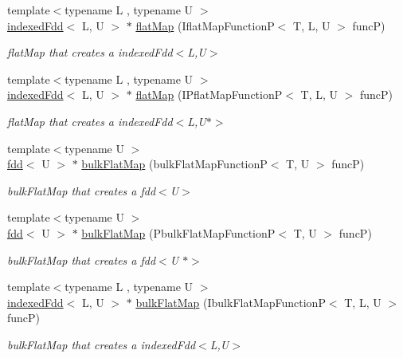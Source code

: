 \begin{DoxyCompactItemize}
{\footnotesize template$<$typename L , typename U $>$ }\\\hyperlink{classfaster_1_1indexedFdd}{indexed\+Fdd}$<$ L, U $>$ $\ast$ \hyperlink{group__flatmap_ga499a1c3638cc1e95e483cd91c7a884a7}{flat\+Map} (Iflat\+Map\+FunctionP$<$ T, L, U $>$ funcP)
\begin{DoxyCompactList}\small\item\em flat\+Map that creates a indexed\+Fdd$<$\+L,\+U$>$ \end{DoxyCompactList}\item 
{\footnotesize template$<$typename L , typename U $>$ }\\\hyperlink{classfaster_1_1indexedFdd}{indexed\+Fdd}$<$ L, U $>$ $\ast$ \hyperlink{group__flatmap_gab1c639e6fe55d66ac0cb50011d537567}{flat\+Map} (I\+Pflat\+Map\+FunctionP$<$ T, L, U $>$ funcP)
\begin{DoxyCompactList}\small\item\em flat\+Map that creates a indexed\+Fdd$<$\+L,\+U$\ast$$>$ \end{DoxyCompactList}\item 
{\footnotesize template$<$typename U $>$ }\\\hyperlink{classfaster_1_1fdd}{fdd}$<$ U $>$ $\ast$ \hyperlink{group__bulk_ga6f87b4e650b28ea32c363f6d902babb1}{bulk\+Flat\+Map} (bulk\+Flat\+Map\+FunctionP$<$ T, U $>$ funcP)
\begin{DoxyCompactList}\small\item\em bulk\+Flat\+Map that creates a fdd$<$\+U$>$ \end{DoxyCompactList}\item 
{\footnotesize template$<$typename U $>$ }\\\hyperlink{classfaster_1_1fdd}{fdd}$<$ U $>$ $\ast$ \hyperlink{group__bulk_ga77058c1365a8696105acaf1468e8d3b4}{bulk\+Flat\+Map} (Pbulk\+Flat\+Map\+FunctionP$<$ T, U $>$ funcP)
\begin{DoxyCompactList}\small\item\em bulk\+Flat\+Map that creates a fdd$<$\+U $\ast$$>$ \end{DoxyCompactList}\item 
{\footnotesize template$<$typename L , typename U $>$ }\\\hyperlink{classfaster_1_1indexedFdd}{indexed\+Fdd}$<$ L, U $>$ $\ast$ \hyperlink{group__bulk_gadfcb736f7161db476dbbb275f1d08659}{bulk\+Flat\+Map} (Ibulk\+Flat\+Map\+FunctionP$<$ T, L, U $>$ funcP)
\begin{DoxyCompactList}\small\item\em bulk\+Flat\+Map that creates a indexed\+Fdd$<$\+L,\+U$>$ \end{DoxyCompactList}\item 

\end{DoxyCompactItemize}
